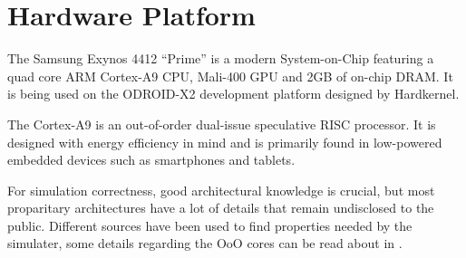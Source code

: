 \section{Hardware Platform}

The Samsung Exynos 4412 ``Prime'' is a modern System-on-Chip featuring a quad
core ARM Cortex-A9 CPU, Mali-400 GPU and 2GB of on-chip DRAM. It is being used
on the ODROID-X2 development platform designed by Hardkernel.

The Cortex-A9 is an out-of-order dual-issue speculative RISC processor. It is
designed with energy efficiency in mind and is primarily found in low-powered
embedded devices such as smartphones and tablets.

For simulation correctness, good architectural knowledge is crucial, but most
proparitary architectures have a lot of details that remain undisclosed to the
public. Different sources have been used to find properties needed by the simulater,
some details regarding the OoO cores can be read about in \cite{blem2013detailed}.
